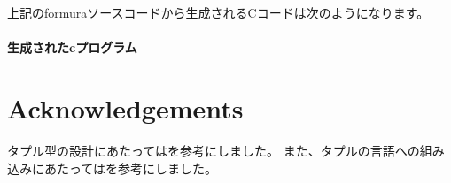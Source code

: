 \documentclass{jsarticle}
\begin{document}
上記のformuraソースコードから生成されるCコードは次のようになります。

\paragraph{生成されたcプログラム}







\newpage



\section*{Acknowledgements}

タプル型の設計にあたっては\citet{pierce2002types}を参考にしました。
また、タプルの言語への組み込みにあたっては\citet{oliveira2015modular}を参考にしました。





\end{document}
